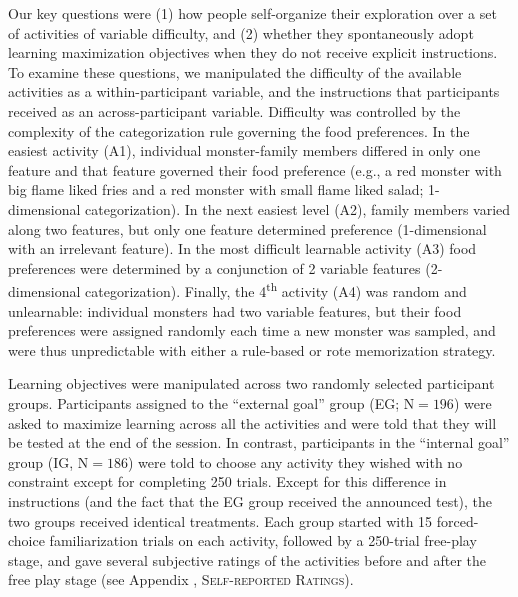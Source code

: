 Our key questions were (1) how people self-organize their exploration over a set of activities of variable difficulty, and (2) whether they spontaneously adopt learning maximization objectives when they do not receive explicit instructions. To examine these questions, we manipulated the difficulty of the available activities as a within-participant variable, and the instructions that participants received as an across-participant variable. Difficulty was controlled by the complexity of the categorization rule governing the food preferences.  In the easiest activity (A1), individual monster-family members differed in only one feature and that feature governed their food preference (e.g., a red monster with big flame liked fries and a red monster with small flame liked salad; 1-dimensional categorization). In the next easiest level (A2), family members varied along two features, but only one feature determined preference (1-dimensional with an irrelevant feature). In the most difficult learnable activity (A3)  food preferences were determined by a conjunction of 2 variable features (2-dimensional categorization). Finally, the 4\textsuperscript{th} activity (A4) was random and unlearnable: individual monsters had two variable features, but their food preferences were assigned randomly each time a new monster was sampled, and were thus unpredictable with either a rule-based or rote memorization strategy.

Learning objectives were manipulated across two randomly selected  participant groups. Participants assigned to the “external goal” group (\ac{EG}; $\text{N} = 196$) were asked to maximize learning across all the activities and were told that they will be tested at the end of the session. In contrast, participants in the “internal goal” group (\ac{IG}, $\text{N} = 186$) were told to choose any activity they wished with no constraint except for completing 250 trials. Except for this difference in instructions (and the fact that the \ac{EG} group received the announced test), the two groups received identical treatments. Each group started with 15 forced-choice familiarization trials on each activity, followed by a 250-trial free-play stage, and gave several subjective ratings of the activities before and after the free play stage (see Appendix , \textsc{Self-reported Ratings}).

